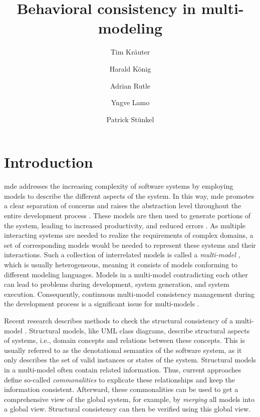 \documentclass{jot}
\title{Behavioral consistency in multi-modeling}
\author[$\ast$]{Tim Kräuter}
\author[$\ast\dagger$]{Harald König}
\author[$\ast$]{Adrian Rutle}
\author[$\ast$]{Yngve Lamo}
\author[$\ddagger$]{Patrick Stünkel}
\affil[$\ast$]{Western Norway University of Applied Sciences, Bergen, Norway}
\affil[$\dagger$]{University of Applied Sciences, FHDW, Hannover, Germany}
\affil[$\ddagger$]{Haukeland Universitetssykehus, Bergen, Norway}
\begin{document}
    
\maketitle
{}

\section{Introduction} \label{sec:introduction}
\gls*{mde} addresses the increasing complexity of software systems by employing models to describe the different aspects of the system.
In this way, \gls*{mde} promotes a clear separation of concerns and raises the abstraction level throughout the entire development process \cite{franceModeldrivenDevelopmentComplex2007}.
These models are then used to generate portions of the system, leading to increased productivity, and reduced errors \cite{brambillaModeldrivenSoftwareEngineering2017}.
As multiple interacting systems are needed to realize the requirements of complex domains, a set of corresponding models would be needed to represent these systems and their interactions.
Such a collection of interrelated models is called a \textit{multi-model} \cite{boronatWhatMultimodelingLanguage2009}, which is usually heterogeneous, meaning it consists of models conforming to different modeling languages.
Models in a multi-model contradicting each other can lead to problems during development, system generation, and system execution.
Consequently, continuous multi-model consistency management during the development process is a significant issue for multi-models \cite{spanoudakisInconsistencyManagementSoftware2001, cicchettiMultiviewApproachesSoftware2019}.

Recent research describes methods to check the structural consistency of a multi-model \cite{stunkelComprehensiveSystemsFormal2021, klareCommonalitiesPreservingConsistency2019}.
Structural models, like UML class diagrams, describe structural aspects of systems, i.e., domain concepts and relations between these concepts.
This is usually referred to as the denotational semantics of the software system, as it only describes the set of valid instances or states of the system.
Structural models in a multi-model often contain related information.
Thus, current approaches define so-called \textit{commonalities} to explicate these relationships and keep the information consistent.
Afterward, these commonalities can be used to get a comprehensive view of the global system, for example, by \textit{merging} all models into a global view.
Structural consistency can then be verified using this global view.
\end{document}
